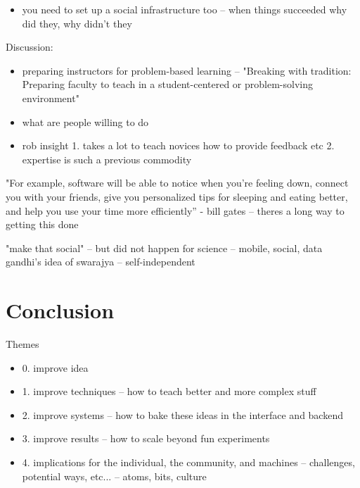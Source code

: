 \begin{itemize}
\item you need to set up a social infrastructure too -- when things succeeded why did they, why didn't they

\end{itemize}

Discussion: 
\begin{itemize}
\item preparing instructors for problem-based learning -- "Breaking with tradition: Preparing faculty to teach in a student-centered or problem-solving environment"
\item what are people willing to do 
\item rob insight
1. takes a lot to teach novices how to provide feedback etc 
2. expertise is such a previous commodity
\end{itemize}

"For example, software will be able to notice when you’re feeling down, connect you with your friends, give you personalized tips for sleeping and eating better, and help you use your time more efficiently” - bill gates -- theres a long way to getting this done

"make that social" -- but did not happen for science -- mobile, social, data
gandhi’s idea of swarajya -- self-independent 




\chapter{Conclusion}

Themes
\begin{itemize}
\item 0. improve idea
\item 1. improve techniques  -- how to teach better and more complex stuff
\item 2. improve systems -- how to bake these ideas in the interface and backend
\item 3. improve results -- how to scale beyond fun experiments
\item 4. implications for the individual, the community, and machines -- challenges, potential ways, etc... -- atoms, bits, culture
\end{itemize}

